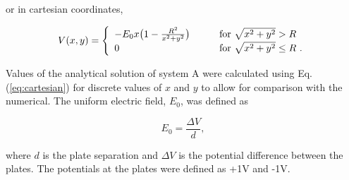 \documentclass[a4paper]{jpconf}
\begin{document}
\noindent or in cartesian coordinates, 

\begin{equation}
V(x,y) = \left\{ 
  \begin{array}{l l}
   -E_0 x \big(1 - \frac{R^2}{x^2 + y^2}\big) & \qquad \text{for $\sqrt{x^2 + y^2} > R$}\\
    0 & \qquad \text{for $\sqrt{x^2 + y^2} \le R$~.}
  \end{array} \right.
  \label{eq:cartesian}
\end{equation}

%

Values of the analytical solution of system A were calculated using Eq.(\ref{eq:cartesian}) for discrete values of $x$ and $y$ to allow for comparison with the numerical. The uniform electric field, $E_0$, was defined as

\begin{equation}
	E_0 = \frac{\Delta V}{d},
\end{equation} 

\noindent where $d$ is the plate separation and $\Delta V$ is the potential difference between the plates. The potentials at the plates were defined as +1V and -1V. \\

%
\end{document}
